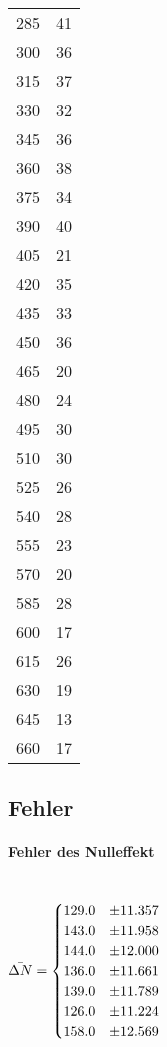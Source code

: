 \begin{table}
\begin{minipage}{.5\linewidth}
\begin{tabular}{c c}
            285	 &  41 \\
            300	 &  36 \\
            315	 &  37 \\
            330	 &  32 \\
            345	 &  36 \\
            360	 &  38 \\
            375	 &  34 \\
            390	 &  40 \\
            405	 &  21 \\
            420	 &  35 \\
            435	 &  33 \\
            450	 &  36 \\
            465	 &  20 \\
            480	 &  24 \\
            495	 &  30 \\
            510	 &  30 \\
            525	 &  26 \\
            540	 &  28 \\
            555	 &  23 \\
            570	 &  20 \\
            585	 &  28 \\
            600	 &  17 \\
            615	 &  26 \\
            630	 &  19 \\
            645	 &  13 \\
            660	 &  17 \\
            \bottomrule
        \end{tabular}
    \end{minipage}
\end{table}
\newpage
\subsection{Fehler}

\paragraph{Fehler des Nulleffekt} \mbox{} \\

$\bar{\Delta N} = \begin{cases}
\centering
129.0 & \pm 11.357   \\
143.0 & \pm 11.958    \\
144.0 & \pm 12.000      \\
136.0 & \pm 11.661    \\
139.0 & \pm 11.789   \\
126.0 & \pm 11.224   \\
158.0 & \pm 12.569    
\end{cases}$

